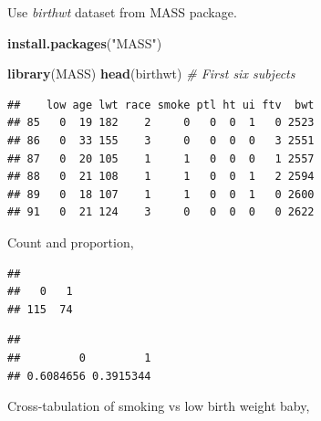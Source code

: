 \documentclass[]{book}
\newenvironment{Shaded}{\begin{snugshade}}{\end{snugshade}}
\newcommand{\KeywordTok}[1]{\textcolor[rgb]{0.13,0.29,0.53}{\textbf{#1}}}
\newcommand{\StringTok}[1]{\textcolor[rgb]{0.31,0.60,0.02}{#1}}
\newcommand{\CommentTok}[1]{\textcolor[rgb]{0.56,0.35,0.01}{\textit{#1}}}
\newcommand{\OperatorTok}[1]{\textcolor[rgb]{0.81,0.36,0.00}{\textbf{#1}}}
\newcommand{\NormalTok}[1]{#1}
\theoremstyle{definition}
\theoremstyle{definition}
\theoremstyle{remark}
\begin{document}
Use \emph{birthwt} dataset from MASS package.

\begin{Shaded}
\begin{Highlighting}[]
\KeywordTok{install.packages}\NormalTok{(}\StringTok{"MASS"}\NormalTok{)}
\end{Highlighting}
\end{Shaded}

\begin{Shaded}
\begin{Highlighting}[]
\KeywordTok{library}\NormalTok{(MASS)}
\KeywordTok{head}\NormalTok{(birthwt)  }\CommentTok{# First six subjects}
\end{Highlighting}
\end{Shaded}

\begin{verbatim}
##    low age lwt race smoke ptl ht ui ftv  bwt
## 85   0  19 182    2     0   0  0  1   0 2523
## 86   0  33 155    3     0   0  0  0   3 2551
## 87   0  20 105    1     1   0  0  0   1 2557
## 88   0  21 108    1     1   0  0  1   2 2594
## 89   0  18 107    1     1   0  0  1   0 2600
## 91   0  21 124    3     0   0  0  0   0 2622
\end{verbatim}

Count and proportion,

\begin{Shaded}
\end{Shaded}

\begin{verbatim}
## 
##   0   1 
## 115  74
\end{verbatim}

\begin{Shaded}
\end{Shaded}

\begin{verbatim}
## 
##         0         1 
## 0.6084656 0.3915344
\end{verbatim}

Cross-tabulation of smoking vs low birth weight baby,

\begin{Shaded}
\end{Shaded}
\end{document}
